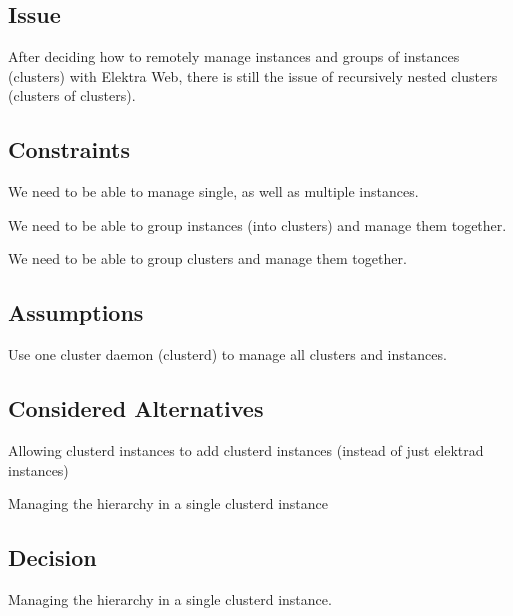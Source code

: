 \subsection*{Issue}

After deciding how to remotely manage instances and groups of instances (clusters) with Elektra Web, there is still the issue of recursively nested clusters (clusters of clusters).

\subsection*{Constraints}


\begin{DoxyItemize}
\item We need to be able to manage single, as well as multiple instances.
\item We need to be able to group instances (into clusters) and manage them together.
\item We need to be able to group clusters and manage them together.
\end{DoxyItemize}

\subsection*{Assumptions}


\begin{DoxyItemize}
\item Use one cluster daemon (clusterd) to manage all clusters and instances.
\end{DoxyItemize}

\subsection*{Considered Alternatives}


\begin{DoxyItemize}
\item Allowing clusterd instances to add clusterd instances (instead of just elektrad instances)
\item Managing the hierarchy in a single clusterd instance
\end{DoxyItemize}

\subsection*{Decision}

Managing the hierarchy in a single clusterd instance.

